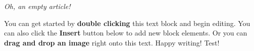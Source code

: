 \textit{Oh, an empty article!} 







You can get started by \textbf{double clicking} this text block and begin editing. You can also click the \textbf{Insert} button below to add new block elements. Or you can \textbf{drag and drop an image} right onto this text. Happy writing!
\colon
Test!

